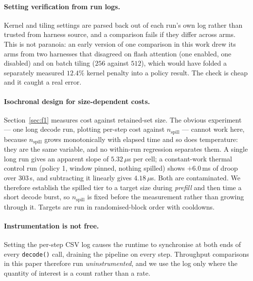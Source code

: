 \documentclass[manuscript,anonymous,review]{acmart}
\begin{document}
\paragraph{Setting verification from run logs.} Kernel and tiling
settings are parsed back out of each run's own log rather than trusted
from harness source, and a comparison fails if they differ across arms.
This is not paranoia: an early version of one comparison in this work
drew its arms from two harnesses that disagreed on flash attention
(one enabled, one disabled) and on batch tiling ($256$ against $512$),
which would have folded a separately measured $12.4\%$ kernel penalty
into a policy result. The check is cheap and it caught a real error.

\paragraph{Isochronal design for size-dependent costs.}
Section~\ref{sec:f1} measures cost against retained-set size. The
obvious experiment --- one long decode run, plotting per-step cost
against $n_\text{spill}$ --- cannot work here, because
$n_\text{spill}$ grows monotonically with elapsed time and so does
temperature: they are the same variable, and no within-run regression
separates them. A single long run gives an apparent slope of
$5.32\,\mu$s per cell; a constant-work thermal control run
(policy 1, window pinned, nothing spilled) shows $+6.0$\,ms of droop
over $303$\,s, and subtracting it linearly gives $4.18\,\mu$s. Both are
contaminated. We therefore establish the spilled tier to a target size
during \emph{prefill} and then time a short decode burst, so
$n_\text{spill}$ is fixed before the measurement rather than growing
through it. Targets are run in randomised-block order with cooldowns.

\paragraph{Instrumentation is not free.} Setting the per-step CSV log
causes the runtime to synchronise at both ends of every
\texttt{decode()} call, draining the pipeline on every step. Throughput
comparisons in this paper therefore run \emph{uninstrumented}, and we
use the log only where the quantity of interest is a count rather than
a rate.
\end{document}
